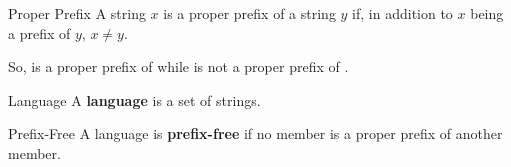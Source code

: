 \documentclass[letterpaper]{article}
\begin{document}
\begin{definition}{Proper Prefix}{}
    A string $x$ is a proper prefix of a string $y$ if, in addition to $x$ being a prefix of $y$, $x \neq y$.
\end{definition}
So,  is a proper prefix of  while  is not a proper prefix of .

\begin{definition}{Language}{}
    A \textbf{language} is a set of strings. 
\end{definition}

\begin{definition}{Prefix-Free}{}
    A language is \textbf{prefix-free} if no member is a proper prefix of another member.
\end{definition}













\newpage 
\end{document}
